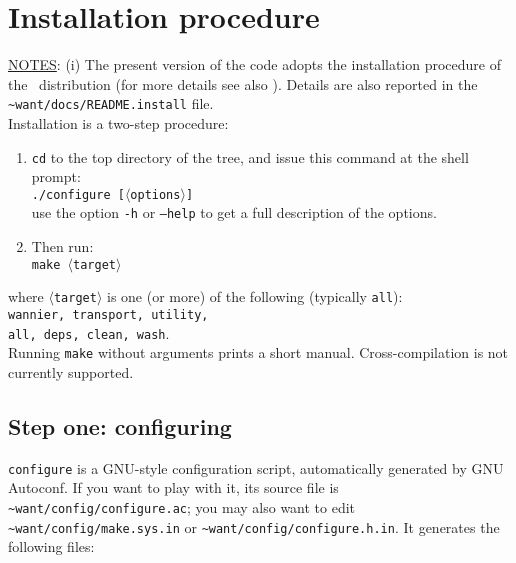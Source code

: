 
\thispagestyle{empty}
\section{Installation procedure}\label{section:install}

\noindent \underline {NOTES}: (i) The present version of the code
adopts the installation procedure of the \QUANTUMESPRESSO\ distribution (for more details see
also \QUANTUMESPRESSOURL). 
Details are also reported in the {\tt \~{}want/docs/README.install} file. \\

\noindent Installation is a two-step procedure:
%
%
\begin{enumerate}
\item \texttt{cd} to the top directory of the \WANT{} tree,
and issue this command at the shell
prompt:\\
{\tt ./configure [$\langle$options$\rangle$] } \\
use the option {\tt -h} or {\tt --help} to get a full description of the options.
\item Then run:\\
     {\tt make $\langle$target$\rangle$ }
\end{enumerate}
%
%
\noindent
where {\tt $\langle$target$\rangle$} is one (or more) of the following (typically {\tt all}):\\[10pt]
{\tt wannier, transport, utility, \\
all, deps, clean, wash}. \\[15pt] 

\noindent
Running {\tt make} without arguments prints a short manual.
Cross-compilation is not currently supported.


\subsection{Step one: configuring} {\tt configure} is a GNU-style configuration script,
automatically generated by GNU Autoconf. If you want to play
with it, its source file is {\tt \~{}want/config/configure.ac}; you may also
want to edit {\tt \~{}want/config/make.sys.in} or {\tt \~{}want/config/configure.h.in}. 
It generates the following files: \\

